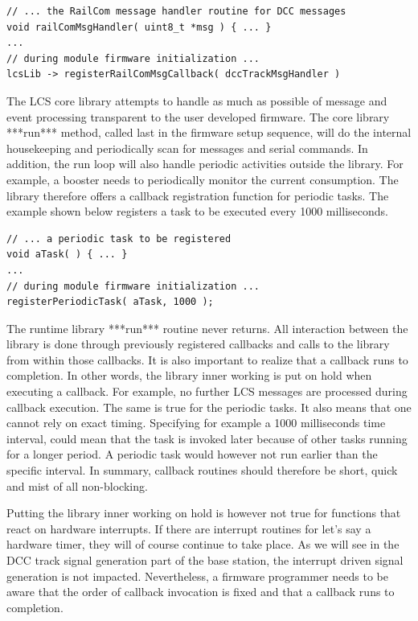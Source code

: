 \lstset{style=codesnippetstyle}
\begin{lstlisting}
// ... the RailCom message handler routine for DCC messages
void railComMsgHandler( uint8_t *msg ) { ... }
...
// during module firmware initialization ...
lcsLib -> registerRailComMsgCallback( dccTrackMsgHandler )
\end{lstlisting}


The LCS core library attempts to handle as much as possible of message and event processing transparent to the user developed firmware. The core library ***run*** method, called last in the firmware setup sequence, will do the internal housekeeping and periodically scan for messages and serial commands. In addition, the run loop will also handle periodic activities outside the library. For example, a booster needs to periodically monitor the current consumption. The library therefore offers a callback registration function for periodic tasks. The example shown below registers a task to be executed every 1000 milliseconds.

\lstset{style=codesnippetstyle}
\begin{lstlisting}
// ... a periodic task to be registered
void aTask( ) { ... }
...
// during module firmware initialization ...
registerPeriodicTask( aTask, 1000 );
\end{lstlisting}

The runtime library ***run*** routine never returns. All interaction between the library is done through previously registered callbacks and calls to the library from within those callbacks. It is also important to realize that a callback runs to completion. In other words, the library inner working is put on hold when executing a callback. For example, no further LCS messages are processed during callback execution. The same is true for the periodic tasks. It also means that one cannot rely on exact timing. Specifying for example a 1000 milliseconds time interval, could mean that the task is invoked later because of other tasks running for a longer period. A periodic task would however not run earlier than the specific interval. In summary, callback routines should therefore be short, quick and mist of all non-blocking.

Putting the library inner working on hold is however not true for functions that react on hardware interrupts. If there are interrupt routines for let's say a hardware timer, they will of course continue to take place. As we will see in the DCC track signal generation part of the base station, the interrupt driven signal generation is not impacted. Nevertheless, a firmware programmer needs to be aware that the order of callback invocation is fixed and that a callback runs to completion.

